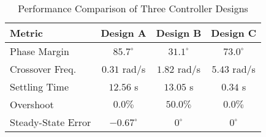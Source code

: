 \begin{table}[h!]
\centering
\caption{Performance Comparison of Three Controller Designs}
\begin{tabular}{lccc}
\hline
\textbf{Metric} & \textbf{Design A} & \textbf{Design B} & \textbf{Design C} \\
\hline
Phase Margin & $85.7^\circ$ & $31.1^\circ$ & $73.0^\circ$ \\
Crossover Freq. & $0.31$ rad/s & $1.82$ rad/s & $5.43$ rad/s \\
Settling Time & $12.56$ s & $13.05$ s & $0.34$ s \\
Overshoot & $0.0\%$ & $50.0\%$ & $0.0\%$ \\
Steady-State Error & $-0.67^\circ$ & $0^\circ$ & $0^\circ$ \\
\hline
\end{tabular}
\label{tab:performance_comparison}
\end{table}
